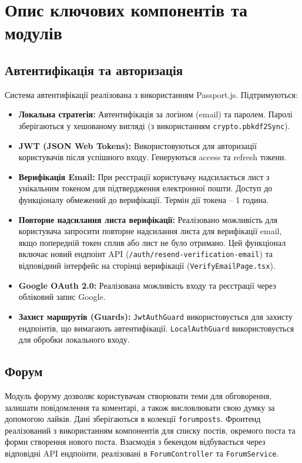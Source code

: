 \section{Опис ключових компонентів та модулів}
\label{sec:key_components}

\subsection{Автентифікація та авторизація}
Система автентифікації реалізована з використанням Passport.js. Підтримуються:
\begin{itemize}
    \item \textbf{Локальна стратегія:} Автентифікація за логіном (email) та паролем. Паролі зберігаються у хешованому вигляді (з використанням \texttt{crypto.pbkdf2Sync}).
    \item \textbf{JWT (JSON Web Tokens):} Використовуються для авторизації користувачів після успішного входу. Генеруються access та refresh токени.
    \item \textbf{Верифікація Email:} При реєстрації користувачу надсилається лист з унікальним токеном для підтвердження електронної пошти. Доступ до функціоналу обмежений до верифікації. Термін дії токена -- 1 година.
    \item \textbf{Повторне надсилання листа верифікації:} Реалізовано можливість для користувача запросити повторне надсилання листа для верифікації email, якщо попередній токен сплив або лист не було отримано. Цей функціонал включає новий ендпоінт API (\texttt{/auth/resend-verification-email}) та відповідний інтерфейс на сторінці верифікації (\texttt{VerifyEmailPage.tsx}).
    \item \textbf{Google OAuth 2.0:} Реалізована можливість входу та реєстрації через обліковий запис Google.
    \item \textbf{Захист маршрутів (Guards):} \texttt{JwtAuthGuard} використовується для захисту ендпоінтів, що вимагають автентифікації. \texttt{LocalAuthGuard} використовується для обробки локального входу.
\end{itemize}

\subsection{Форум}
Модуль форуму дозволяє користувачам створювати теми для обговорення, залишати повідомлення та коментарі, а також висловлювати свою думку за допомогою лайків. Дані зберігаються в колекції \texttt{forumposts}. Фронтенд реалізований з використанням компонентів для списку постів, окремого поста та форми створення нового поста. Взаємодія з бекендом відбувається через відповідні API ендпоінти, реалізовані в \texttt{ForumController} та \texttt{ForumService}.

